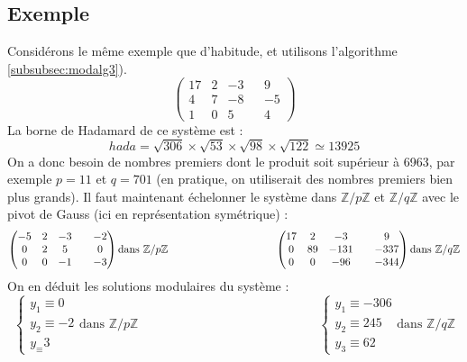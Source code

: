 \documentclass[french]{article}
\begin{document}
\subsection{Exemple}
Considérons le même exemple que d'habitude, et utilisons l'algorithme \ref{subsubsec:modalg3}).
\begin{equation*}
	\begin{pmatrix}
		17 & 2 & -3 & & 9\\
		4 & 7 & -8 & & -5\\
		1 & 0 & 5 & & 4
	\end{pmatrix}
\end{equation*}
La borne de Hadamard de ce système est :
$$hada = \sqrt{306}\times\sqrt{53}\times\sqrt{98}\times\sqrt{122} \simeq 13925$$
On a donc besoin de nombres premiers dont le produit soit supérieur à 6963, par exemple $p = 11$ et  $q = 701$ (en pratique, on utiliserait des nombres premiers bien plus grands). Il faut maintenant échelonner le système dans $\mathbb{Z}/p\mathbb{Z}$ et $\mathbb{Z}/q\mathbb{Z}$ avec le pivot de Gauss (ici en représentation symétrique) :
\begin{equation*}
	\begin{pmatrix}
		-5 & 2 & -3 & & -2\\
		0 & 2 & 5 & & 0\\
		0 & 0 & -1 & & -3
	\end{pmatrix}
	\mbox{dans } \mathbb{Z}/p\mathbb{Z}
	\hspace{3,5cm}
	\begin{pmatrix}
		17 & 2 & -3 & & 9\\
		0 & 89 & -131 & & -337\\
		0 & 0 & -96 & & -344
	\end{pmatrix}
	\mbox{dans } \mathbb{Z}/q\mathbb{Z}
\end{equation*}
On en déduit les solutions modulaires du système :
\begin{equation*}
	\begin{cases}
		y_1 \equiv 0\\
		y_2 \equiv -2\\
		y_\equiv 3
	\end{cases}
	\mbox{dans } \mathbb{Z}/p\mathbb{Z}
	\hspace{6cm}
	\begin{cases}
		y_1 \equiv -306\\
		y_2 \equiv 245\\
		y_3 \equiv 62
	\end{cases}
	\mbox{dans } \mathbb{Z}/q\mathbb{Z}
\end{equation*}
\end{document}
